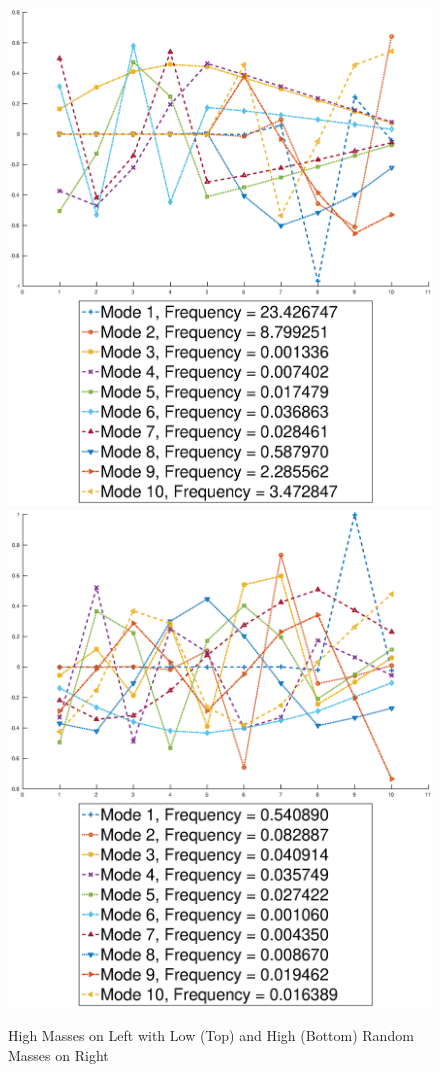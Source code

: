 \documentclass[10pt,a4paper]{article}
\begin{document}
\begin{multicols*}{2}
\begin{figure}[H]
	\includegraphics[width=\columnwidth]{figures/high-lowrand.eps}
	\includegraphics[width=\columnwidth]{figures/high-highrand.eps}
	\caption{High Masses on Left with Low (Top) and High (Bottom) Random Masses on Right}
	\label{fig: high-rand}	
\end{figure}


\end{multicols*}
\end{document}
